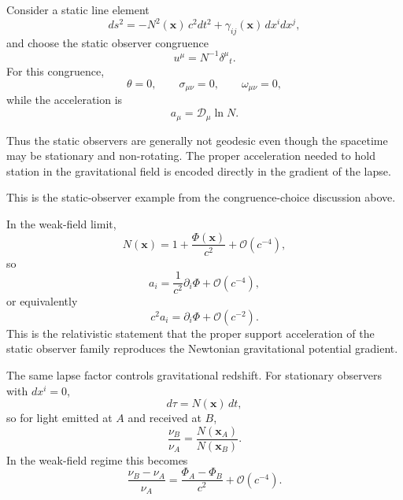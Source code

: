 \documentclass[11pt]{article}
\newcommand{\Proj}{\mathcal{D}}
\begin{document}
Consider a static line element
\begin{equation}
ds^2
=
-N^2(\mathbf{x})\,c^2dt^2
+
\gamma_{ij}(\mathbf{x})\,dx^i dx^j,
\label{eq:staticmetric}
\end{equation}
and choose the static observer congruence
\begin{equation}
u^\mu = N^{-1}\delta^\mu{}_t.
\label{eq:staticu}
\end{equation}
For this congruence,
\begin{equation}
\theta=0,
\qquad
\sigma_{\mu\nu}=0,
\qquad
\omega_{\mu\nu}=0,
\label{eq:statickinematics}
\end{equation}
while the acceleration is
\begin{equation}
a_\mu = \Proj_\mu \ln N.
\label{eq:staticacceleration}
\end{equation}

Thus the static observers are generally not geodesic even though the spacetime may be stationary and non-rotating. The proper acceleration needed to hold station in the gravitational field is encoded directly in the gradient of the lapse.

This is the static-observer example from the congruence-choice discussion above.

In the weak-field limit,
\begin{equation}
N(\mathbf{x})
=
1+\frac{\Phi(\mathbf{x})}{c^2}
+\mathcal{O}(c^{-4}),
\label{eq:lapseweakfield}
\end{equation}
so
\begin{equation}
a_i
=
\frac{1}{c^2}\partial_i \Phi
+\mathcal{O}(c^{-4}),
\label{eq:weakfieldacceleration}
\end{equation}
or equivalently
\begin{equation}
c^2 a_i
=
\partial_i \Phi
+\mathcal{O}(c^{-2}).
\label{eq:physicalacceleration}
\end{equation}
This is the relativistic statement that the proper support acceleration of the static observer family reproduces the Newtonian gravitational potential gradient.

The same lapse factor controls gravitational redshift. For stationary observers with \(dx^i=0\),
\begin{equation}
d\tau = N(\mathbf{x})\,dt,
\label{eq:stationarytime}
\end{equation}
so for light emitted at \(A\) and received at \(B\),
\begin{equation}
\frac{\nu_B}{\nu_A}
=
\frac{N(\mathbf{x}_A)}{N(\mathbf{x}_B)}.
\label{eq:redshift}
\end{equation}
In the weak-field regime this becomes
\begin{equation}
\frac{\nu_B-\nu_A}{\nu_A}
=
\frac{\Phi_A-\Phi_B}{c^2}
+\mathcal{O}(c^{-4}).
\label{eq:redshiftweakfield}
\end{equation}
\end{document}
